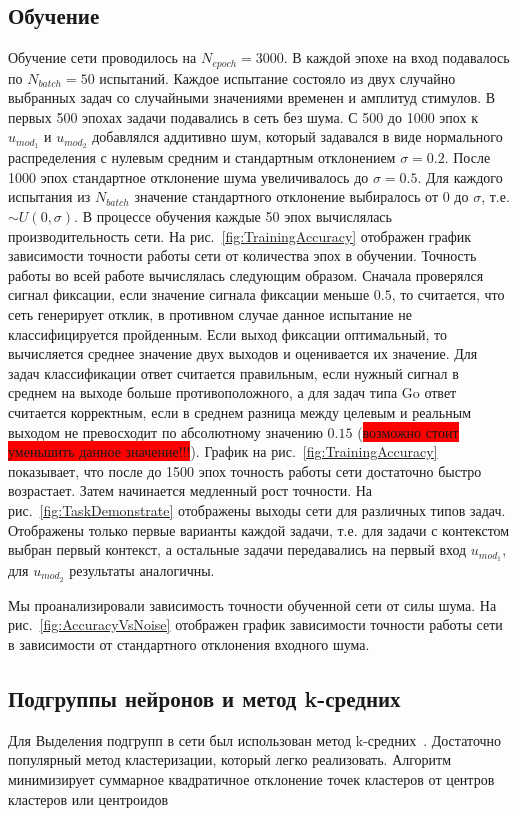 \documentclass{article}
\begin{document}
\subsection{Обучение}
Обучение сети проводилось на $N_{epoch} = 3000$. В каждой эпохе на вход подавалось по $N_{batch} = 50$ испытаний. Каждое испытание состояло из двух случайно выбранных задач со случайными значениями временен и амплитуд стимулов. В первых 500 эпохах задачи подавались в сеть без шума. С 500 до 1000 эпох к $u_{mod_1}$ и $u_{mod_2}$ добавлялся аддитивно шум, который задавался в виде нормального распределения с нулевым средним и стандартным отклонением $\sigma =  0.2$. После 1000 эпох стандартное отклонение шума увеличивалось до $\sigma = 0.5$. Для каждого испытания из $N_{batch}$ значение стандартного отклонение выбиралось от 0 до $\sigma$, т.е. $\sim U(0, \sigma)$. В процессе обучения каждые 50 эпох вычислялась производительность сети. На рис.~\ref{fig:TrainingAccuracy} отображен график зависимости точности работы сети от количества эпох в обучении. Точность работы во всей работе вычислялась следующим образом. Сначала проверялся сигнал фиксации, если значение сигнала фиксации меньше $0.5$, то считается, что сеть генерирует отклик, в противном случае данное испытание не классифицируется пройденным. Если выход фиксации оптимальный, то вычисляется среднее значение двух выходов и оценивается их значение. Для задач классификации ответ считается правильным, если нужный сигнал в среднем на выходе больше противоположного, а для задач типа Go ответ считается корректным, если в среднем разница между целевым и реальным выходом не превосходит по абсолютному значению $0.15$ (\colorbox{red}{возможно стоит уменьшить данное значение!!!}). График на рис.~\ref{fig:TrainingAccuracy} показывает, что после до 1500 эпох точность работы сети достаточно быстро возрастает. Затем начинается медленный рост точности. На рис.~\ref{fig:TaskDemonstrate} отображены выходы сети для различных типов задач. Отображены только первые варианты каждой задачи, т.е. для задачи с контекстом выбран первый контекст, а остальные задачи передавались на первый вход $u_{mod_1}$, для $u_{mod_2}$ результаты аналогичны.

Мы проанализировали зависимость точности обученной сети от силы шума. На рис.~\ref{fig:AccuracyVsNoise} отображен график зависимости точности работы сети в зависимости от стандартного отклонения входного шума.






\subsection{Подгруппы нейронов и метод k-средних}
Для Выделения подгрупп в сети был использован метод k-средних~\cite{steinhaus1956division,lloyd1957least}. Достаточно популярный метод кластеризации, который легко реализовать. Алгоритм минимизирует суммарное квадратичное отклонение точек кластеров от центров кластеров или центроидов
\end{document}
